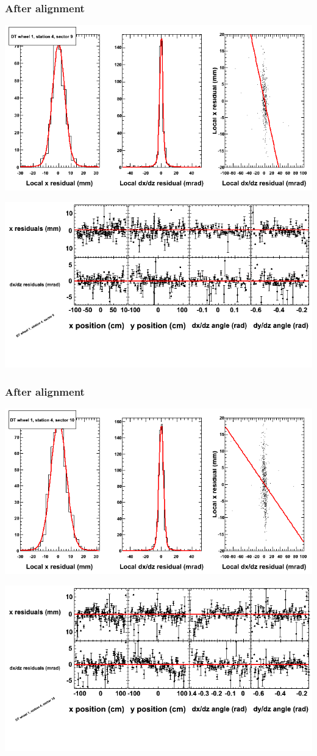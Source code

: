 \documentclass[compress]{beamer}
\begin{document}
\begin{frame}
\frametitle{After alignment}
\includegraphics[width=0.7\linewidth]{NOV4_fitfunctions/MBwhDst4sec09_bellcurves.png}

\includegraphics[width=0.7\linewidth]{NOV4_fitfunctions/MBwhDst4sec09_polynomials.png}
\end{frame}

\begin{frame}
\frametitle{After alignment}
\includegraphics[width=0.7\linewidth]{NOV4_fitfunctions/MBwhDst4sec10_bellcurves.png}

\includegraphics[width=0.7\linewidth]{NOV4_fitfunctions/MBwhDst4sec10_polynomials.png}
\end{frame}
\end{document}
